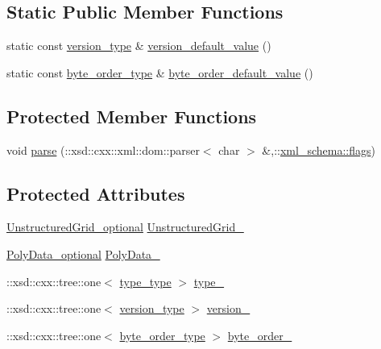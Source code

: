 \subsection*{Static Public Member Functions}
\begin{DoxyCompactItemize}
\item 
static const \hyperlink{classVTKFile__t_a7db6f6d11f363380d6361446f5dede7b}{version\+\_\+type} \& \hyperlink{classVTKFile__t_a0eb5afa9ec6125c0519a891578f31521}{version\+\_\+default\+\_\+value} ()
\item 
static const \hyperlink{classVTKFile__t_ab08dd45c560dd0635d0e5c0a5e42d2e8}{byte\+\_\+order\+\_\+type} \& \hyperlink{classVTKFile__t_a4538fe428d79eff40025d874e200bec1}{byte\+\_\+order\+\_\+default\+\_\+value} ()
\end{DoxyCompactItemize}
\subsection*{Protected Member Functions}
\begin{DoxyCompactItemize}
\item 
void \hyperlink{classVTKFile__t_abce5eb0ea7f326f97fdbd8eeafc69dac}{parse} (\+::xsd\+::cxx\+::xml\+::dom\+::parser$<$ char $>$ \&,\+::\hyperlink{namespacexml__schema_a0612287d030cb2732d31a45b258fdc87}{xml\+\_\+schema\+::flags})
\end{DoxyCompactItemize}
\subsection*{Protected Attributes}
\begin{DoxyCompactItemize}
\item 
\hyperlink{classVTKFile__t_ada5bb5a706e03ef1ab2ed1513ea83833}{Unstructured\+Grid\+\_\+optional} \hyperlink{classVTKFile__t_a8ff0a1326731c3a73403f6a6fb46e0ac}{Unstructured\+Grid\+\_\+}
\item 
\hyperlink{classVTKFile__t_aacb796775ae228cd61726a23b809f3e4}{Poly\+Data\+\_\+optional} \hyperlink{classVTKFile__t_ae7de0b4fb3566ea6b7e4270c4f6560ef}{Poly\+Data\+\_\+}
\item 
\+::xsd\+::cxx\+::tree\+::one$<$ \hyperlink{classVTKFile__t_ac1f3484e4fde414849ede43a00955f76}{type\+\_\+type} $>$ \hyperlink{classVTKFile__t_a59decd8a5c8e51b1b18e2e1b4f13f622}{type\+\_\+}
\item 
\+::xsd\+::cxx\+::tree\+::one$<$ \hyperlink{classVTKFile__t_a7db6f6d11f363380d6361446f5dede7b}{version\+\_\+type} $>$ \hyperlink{classVTKFile__t_a2698aeeae7e59df2c508025a8ef306ae}{version\+\_\+}
\item 
\+::xsd\+::cxx\+::tree\+::one$<$ \hyperlink{classVTKFile__t_ab08dd45c560dd0635d0e5c0a5e42d2e8}{byte\+\_\+order\+\_\+type} $>$ \hyperlink{classVTKFile__t_a84278fcf4e780a361b9b4622e0fbcd13}{byte\+\_\+order\+\_\+}
\end{DoxyCompactItemize}
